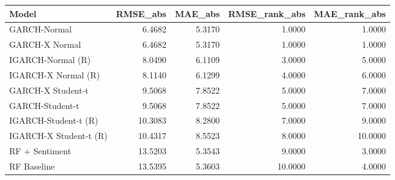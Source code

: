 \begin{tabular}{lrrrr}
\toprule
Model & RMSE_abs & MAE_abs & RMSE_rank_abs & MAE_rank_abs \\
\midrule
GARCH-Normal & 6.4682 & 5.3170 & 1.0000 & 1.0000 \\
GARCH-X Normal & 6.4682 & 5.3170 & 1.0000 & 1.0000 \\
IGARCH-Normal (R) & 8.0490 & 6.1109 & 3.0000 & 5.0000 \\
IGARCH-X Normal (R) & 8.1140 & 6.1299 & 4.0000 & 6.0000 \\
GARCH-X Student-t & 9.5068 & 7.8522 & 5.0000 & 7.0000 \\
GARCH-Student-t & 9.5068 & 7.8522 & 5.0000 & 7.0000 \\
IGARCH-Student-t (R) & 10.3083 & 8.2800 & 7.0000 & 9.0000 \\
IGARCH-X Student-t (R) & 10.4317 & 8.5523 & 8.0000 & 10.0000 \\
RF + Sentiment & 13.5203 & 5.3543 & 9.0000 & 3.0000 \\
RF Baseline & 13.5395 & 5.3603 & 10.0000 & 4.0000 \\
\bottomrule
\end{tabular}
